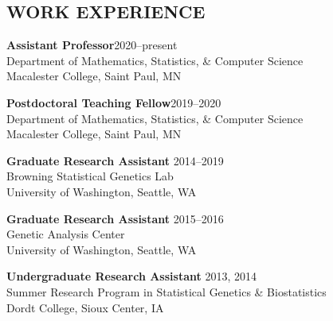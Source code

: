 \documentclass[margin]{res}
\begin{document}
\begin{resume}
\section{WORK EXPERIENCE}

\textbf{Assistant Professor}\hfill 2020--present \\
Department of Mathematics, Statistics, \& Computer Science \\
Macalester College, Saint Paul, MN

\textbf{Postdoctoral Teaching Fellow}\hfill 2019--2020 \\
Department of Mathematics, Statistics, \& Computer Science \\
Macalester College, Saint Paul, MN

\textbf{Graduate Research Assistant} \hfill 2014--2019\\
Browning Statistical Genetics Lab \\
University of Washington, Seattle, WA
	
\textbf{Graduate Research Assistant} \hfill 2015--2016 \\
Genetic Analysis Center \\
University of Washington, Seattle, WA
	

\textbf{Undergraduate Research Assistant} \hfill 2013, 2014 \\
Summer Research Program in Statistical Genetics \& Biostatistics \\
Dordt College, Sioux Center, IA


\end{resume}
\end{document}
